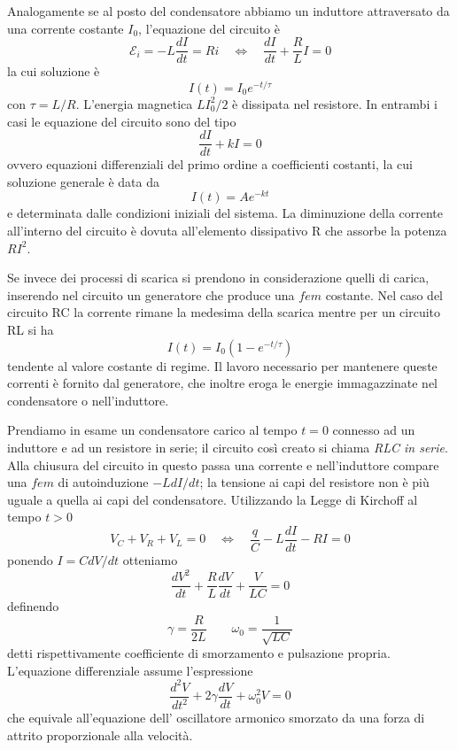 Analogamente se al posto del condensatore abbiamo un induttore attraversato da una corrente  costante $I_0$, l'equazione del circuito \`e 
\begin{equation*}
	\mathcal{E}_i = -L \frac{d I}{dt} = Ri \quad \iff \quad \frac{dI}{dt} + \frac{R}{L}I = 0
\end{equation*}
la cui soluzione \`e 
\begin{equation*}
	I(t) = I_0 e^{-t/\tau}
\end{equation*}
con $\tau = L/R$. L'energia magnetica $L I_0^2/2$ \`e dissipata nel resistore. In entrambi i casi le equazione del circuito sono del tipo
\begin{equation*}
	\frac{dI}{dt}+kI = 0
\end{equation*}
ovvero equazioni differenziali del primo ordine a coefficienti costanti, la cui soluzione generale \`e data da
\begin{equation*}
	I(t) = A e^{-kt}
\end{equation*}
e determinata dalle condizioni iniziali del sistema. La diminuzione della corrente all'interno del circuito \`e dovuta all'elemento dissipativo R che assorbe la potenza $RI^2$.

Se invece dei processi di scarica si prendono in considerazione quelli di carica, inserendo nel circuito un generatore che produce una $fem $ costante. Nel caso del circuito RC la corrente rimane la medesima della scarica mentre per un circuito RL si ha 
\begin{equation*}
	I(t) = I_0(1-e^{-t/\tau})
\end{equation*}
tendente al valore costante di regime. Il lavoro necessario per mantenere queste correnti \`e fornito dal generatore, che inoltre eroga le energie immagazzinate nel condensatore o nell'induttore.
\newline

Prendiamo in esame un condensatore carico al tempo $t = 0$ connesso ad un induttore e ad un resistore in serie; il circuito cos\`i creato si chiama \textit{RLC in serie}. Alla chiusura del circuito in questo passa una corrente e nell'induttore compare una $fem$ di autoinduzione $-L dI/dt$; la tensione ai capi del resistore non \`e pi\`u uguale a quella ai capi del condensatore. Utilizzando la Legge di Kirchoff al tempo $t > 0$
\begin{equation*}
	V_C + V_R + V_L = 0  \quad \iff \quad \frac{q}{C} -L \frac{dI}{dt} -RI = 0
\end{equation*}
 ponendo $I = C dV/dt$ otteniamo 
\begin{equation*}
	\frac{dV^2}{dt} + \frac{R}{L}\frac{dV}{dt} + \frac{V}{LC} = 0
\end{equation*}
definendo 
\begin{equation*}
	\gamma  = \frac{R}{2L} \quad \quad \omega_0 = \frac{1}{\sqrt{LC}} 
\end{equation*}
detti rispettivamente coefficiente di smorzamento e pulsazione propria. L'equazione differenziale assume l'espressione 
\begin{equation}
	\frac{d^2V}{dt^2} + 2 \gamma \frac{dV}{dt} + \omega_0^2V = 0 
\end{equation}
che equivale all'equazione dell' oscillatore armonico smorzato da una forza di attrito proporzionale alla velocit\`a. 

